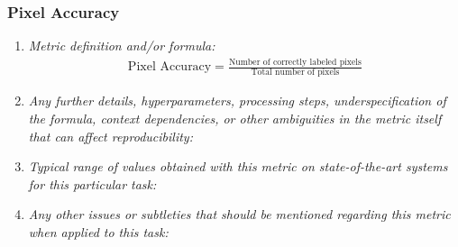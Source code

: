 \documentclass[a4paper,11pt]{article}
\begin{document}
        \subsubsection{Pixel Accuracy}
            \begin{enumerate}[label=\alph*.]
                \item \textit{Metric definition and/or formula:}
                    \begin{align}
                        \textrm{Pixel Accuracy} = \frac{\textrm{Number of correctly labeled pixels}}{\textrm{Total number of pixels}}
                    \end{align}
                \bigskip
                \item \textit{Any further details, hyperparameters, processing steps, underspecification of the formula, context dependencies, or other ambiguities in the metric itself that can affect reproducibility:}
                \bigskip
                \item \textit{Typical range of values obtained with this metric on state-of-the-art systems for this particular task:}
                \bigskip
                \item \textit{Any other issues or subtleties that should be mentioned regarding this metric when applied to this task:}
                \bigskip
            \end{enumerate}
\end{document}
